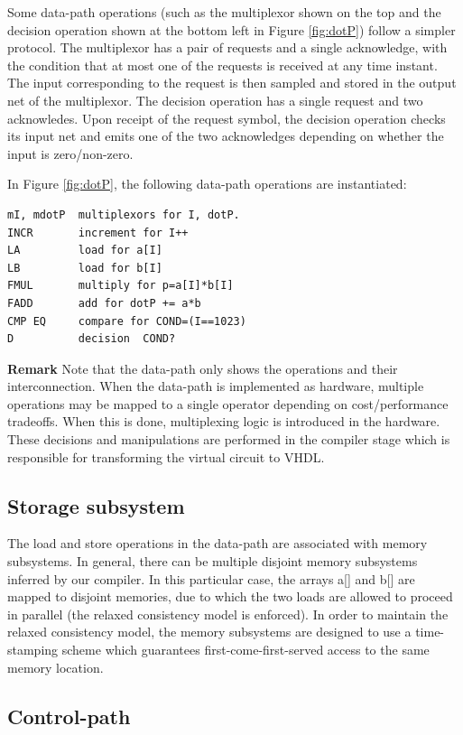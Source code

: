 \documentclass[conference]{IEEEtran}
\begin{document}
Some data-path operations (such as the multiplexor
shown on the top and the decision operation shown at the bottom
left in Figure \ref{fig:dotP}) follow a simpler protocol.  The multiplexor
has a pair of requests and a single acknowledge, with the condition
that at most one of the requests is received at any time instant.
The input corresponding to the request is then sampled and stored
in the output net of the multiplexor.
The decision operation has a single request and two acknowledes.  Upon
receipt of the request symbol, the decision operation checks its input net
and emits one of the two acknowledges depending on whether the input
is zero/non-zero.

In Figure \ref{fig:dotP}, the following data-path operations
are instantiated:
\begin{verbatim}
mI, mdotP  multiplexors for I, dotP.
INCR       increment for I++
LA         load for a[I]
LB         load for b[I]
FMUL       multiply for p=a[I]*b[I]
FADD       add for dotP += a*b
CMP EQ     compare for COND=(I==1023)
D          decision  COND?
\end{verbatim}


\noindent
{\bf Remark}
Note that the data-path only shows the operations and their interconnection.
When the data-path is implemented as hardware, multiple operations may
be mapped to a single operator depending on cost/performance tradeoffs.  When
this is done, multiplexing logic is introduced in the hardware.  These
decisions and manipulations are performed in the compiler stage which is
responsible for transforming the virtual circuit to VHDL.

\subsection{Storage subsystem}

The load and store operations in the data-path
are associated with memory subsystems.  In general, there
can be multiple disjoint memory subsystems inferred by our
compiler.  In this particular case, the arrays a[] and b[] 
are mapped to disjoint memories, due to which the two
loads are allowed to proceed in parallel (the relaxed consistency
model is enforced).
In order to maintain the relaxed consistency model, the
memory subsystems are designed to use a time-stamping 
scheme which guarantees first-come-first-served access to
the same memory location.

\subsection{Control-path}
\end{document}
